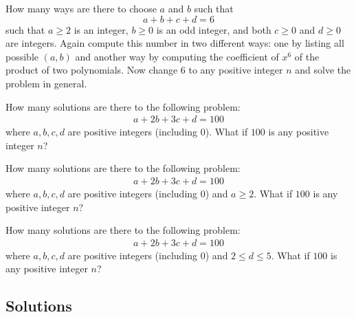 \newpage
\begin{ex}
How many ways are there to choose $a$ and $b$ such that
\[
a + b + c + d = 6
\]
such that $a \geq 2$ is an integer,
$b \geq 0$ is an odd integer,
and both $c \geq 0$ and $d \geq 0$ are integers. 
Again compute this number in two different ways:
one by listing all possible $(a, b)$ and another way by 
computing the coefficient of $x^6$ of the product
of two polynomials.
Now change 6 to any positive integer $n$ and solve the
problem in general.
\end{ex}



\newpage
\begin{ex}
How many solutions are there to
the following problem:
\begin{align*}
a + 2b + 3c + d= 100
\end{align*}
where $a, b, c, d$ are positive integers (including $0$).
What if $100$ is any positive integer $n$?
\end{ex}



\newpage
\begin{ex}
How many solutions are there to
the following problem:
\begin{align*}
a + 2b + 3c + d= 100
\end{align*}
where $a, b, c, d$ are positive integers (including $0$)
and $a \geq 2$.
What if $100$ is any positive integer $n$?
\end{ex}

\newpage
\begin{ex}
How many solutions are there to 
the following problem:
\begin{align*}
a + 2b + 3c + d = 100
\end{align*}
where $a, b, c, d$ are positive integers (including $0$)
and $2 \leq d \leq 5$.
What if $100$ is any positive integer $n$?
\end{ex}

\newpage
\subsection*{Solutions}

